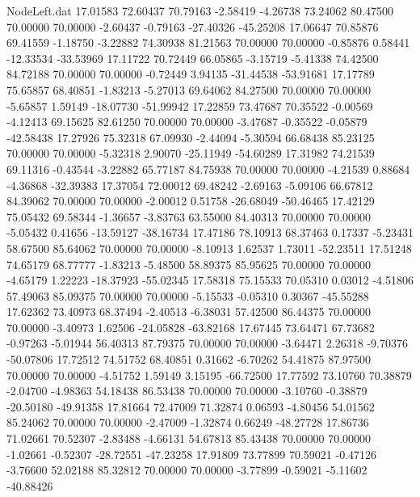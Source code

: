 \begin{filecontents}{NodeLeft.dat}
  17.01583   72.60437   70.79163    -2.58419   -4.26738   73.24062   80.47500   70.00000   70.00000   -2.60437   -0.79163  -27.40326  -45.25208
  17.06647   70.85876   69.41559    -1.18750   -3.22882   74.30938   81.21563   70.00000   70.00000   -0.85876    0.58441  -12.33534  -33.53969
  17.11722   70.72449   66.05865    -3.15719   -5.41338   74.42500   84.72188   70.00000   70.00000   -0.72449    3.94135  -31.44538  -53.91681
  17.17789   75.65857   68.40851    -1.83213   -5.27013   69.64062   84.27500   70.00000   70.00000   -5.65857    1.59149  -18.07730  -51.99942
  17.22859   73.47687   70.35522    -0.00569   -4.12413   69.15625   82.61250   70.00000   70.00000   -3.47687   -0.35522   -0.05879  -42.58438
  17.27926   75.32318   67.09930    -2.44094   -5.30594   66.68438   85.23125   70.00000   70.00000   -5.32318    2.90070  -25.11949  -54.60289
  17.31982   74.21539   69.11316    -0.43544   -3.22882   65.77187   84.75938   70.00000   70.00000   -4.21539    0.88684   -4.36868  -32.39383
  17.37054   72.00012   69.48242    -2.69163   -5.09106   66.67812   84.39062   70.00000   70.00000   -2.00012    0.51758  -26.68049  -50.46465
  17.42129   75.05432   69.58344    -1.36657   -3.83763   63.55000   84.40313   70.00000   70.00000   -5.05432    0.41656  -13.59127  -38.16734
  17.47186   78.10913   68.37463     0.17337   -5.23431   58.67500   85.64062   70.00000   70.00000   -8.10913    1.62537    1.73011  -52.23511
  17.51248   74.65179   68.77777    -1.83213   -5.48500   58.89375   85.95625   70.00000   70.00000   -4.65179    1.22223  -18.37923  -55.02345
  17.58318   75.15533   70.05310     0.03012   -4.51806   57.49063   85.09375   70.00000   70.00000   -5.15533   -0.05310    0.30367  -45.55288
  17.62362   73.40973   68.37494    -2.40513   -6.38031   57.42500   86.44375   70.00000   70.00000   -3.40973    1.62506  -24.05828  -63.82168
  17.67445   73.64471   67.73682    -0.97263   -5.01944   56.40313   87.79375   70.00000   70.00000   -3.64471    2.26318   -9.70376  -50.07806
  17.72512   74.51752   68.40851     0.31662   -6.70262   54.41875   87.97500   70.00000   70.00000   -4.51752    1.59149    3.15195  -66.72500
  17.77592   73.10760   70.38879    -2.04700   -4.98363   54.18438   86.53438   70.00000   70.00000   -3.10760   -0.38879  -20.50180  -49.91358
  17.81664   72.47009   71.32874     0.06593   -4.80456   54.01562   85.24062   70.00000   70.00000   -2.47009   -1.32874    0.66249  -48.27728
  17.86736   71.02661   70.52307    -2.83488   -4.66131   54.67813   85.43438   70.00000   70.00000   -1.02661   -0.52307  -28.72551  -47.23258
  17.91809   73.77899   70.59021    -0.47126   -3.76600   52.02188   85.32812   70.00000   70.00000   -3.77899   -0.59021   -5.11602  -40.88426

\end{filecontents}
